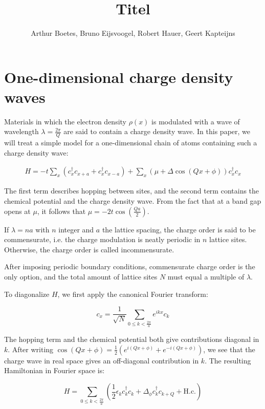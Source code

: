 \documentclass[letterpaper, 10 pt, conference]{ieeeconf}  %
\title{\LARGE \bf
  Titel
}
\author{Arthur Boetes, Bruno Eijsvoogel, Robert Hauer, Geert Kapteijns
}
\begin{document}
\maketitle
\thispagestyle{empty}
\pagestyle{empty}


\section{One-dimensional charge density waves}

Materials in which the electron density $\rho(x)$ is modulated with a wave of
wavelength $\lambda = \frac{2\pi}{Q}$ are said to contain a charge density wave.
In this paper, we will treat a simple model for a one-dimensional chain of atoms containing such a charge density wave:

\begin{align}
H = -t \sum_x (c_x^{\dagger}c_{x+a} + c_x^{\dagger}c_{x-a}) + \sum_x (\mu + \Delta \cos(Qx + \phi))c_x^{\dagger}c_x
\end{align}

The first term describes hopping between sites, and the second term contains the chemical potential and the charge density wave. From the fact that at a band gap opens at $\mu$, it follows that $\mu = -2t\cos(\frac{Qa}{2})$.

If $\lambda = n a$ with $n$ integer and $a$ the lattice spacing, the charge order is said to be commensurate, i.e. the charge modulation is neatly periodic in $n$ lattice sites. Otherwise, the charge order is called incommensurate.

After imposing periodic boundary conditions, commensurate charge order is the only option, and the total amount of lattice sites $N$ must equal a multiple of $\lambda$.

To diagonalize $H$, we first apply the canonical Fourier transform:

$$c_x = \frac{1}{\sqrt{N}}\sum_{0 \leq k < \frac{2\pi}{a}}e^{ikx}c_k$$

The hopping term and the chemical potential both give contributions diagonal in $k$. After writing $\cos(Qx + \phi) = \frac{1}{2}(e^{i(Qx + \phi)} + e^{-i(Qx + \phi)}) $, we see that the charge wave in real space gives an off-diagonal contribution in $k$. The resulting Hamiltonian in Fourier space is:

$$ H = \sum_{0 \leq k < \frac{2\pi}{a}} (\frac{1}{2}\epsilon_k c_k^{\dagger}c_k + \Delta_\phi c_k^{\dagger}c_{k+Q} + \text{H.c.}) $$
\end{document}
